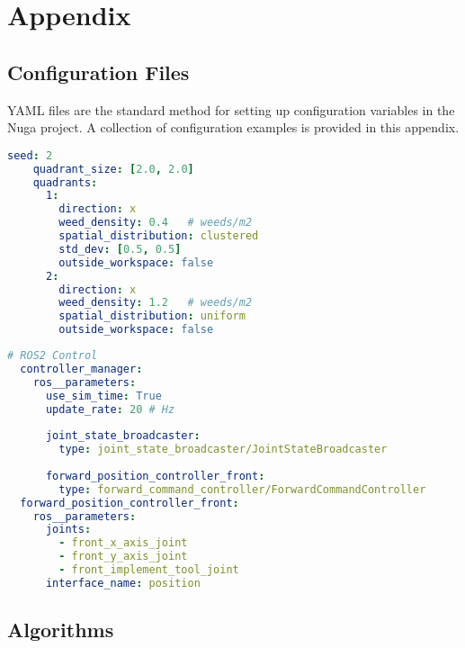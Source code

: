 \chapter{Appendix}\label{sec:appendix}
\section{Configuration Files}
YAML files are the standard method for setting up configuration variables in the Nuga project. A collection of configuration examples is provided in this appendix.

\begin{lstlisting}[language=yaml, frame=tb, caption={Weed Infestation World config example}, label={lst:world-yaml}, float=h]
    seed: 2
    quadrant_size: [2.0, 2.0]
    quadrants:
      1:
        direction: x
        weed_density: 0.4   # weeds/m2
        spatial_distribution: clustered
        std_dev: [0.5, 0.5]
        outside_workspace: false
      2:
        direction: x
        weed_density: 1.2   # weeds/m2
        spatial_distribution: uniform
        outside_workspace: false
\end{lstlisting}

\begin{lstlisting}[language=yaml, frame=tb, caption={ROS$2$ config example}, label={lst:ros2_control-yaml}, float=htb]
  # ROS2 Control
  controller_manager:
    ros__parameters:
      use_sim_time: True
      update_rate: 20 # Hz
  
      joint_state_broadcaster:
        type: joint_state_broadcaster/JointStateBroadcaster
  
      forward_position_controller_front:
        type: forward_command_controller/ForwardCommandController
  forward_position_controller_front:
    ros__parameters:
      joints:
        - front_x_axis_joint
        - front_y_axis_joint
        - front_implement_tool_joint
      interface_name: position
\end{lstlisting}

\clearpage
\section{Algorithms}

